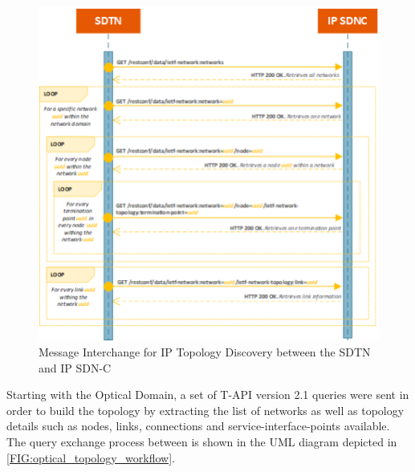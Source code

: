 \documentclass[a4paper,fleqn]{cas-dc}
\begin{document}
\begin{figure}
	\centering
		\includegraphics[width=\linewidth]{figs/ip_topology_workflow.png}
	\caption{Message Interchange for IP Topology Discovery between the SDTN and IP SDN-C}
	\label{FIG:ip_topology_workflow}
\end{figure}

Starting with the Optical Domain, a set of T-API version 2.1 queries were sent in order to build the topology by extracting the list of networks as well as topology details such as nodes, links, connections and service-interface-points available. The query exchange process between is shown in the UML diagram depicted in \cref{FIG:optical_topology_workflow}.  
\end{document}

